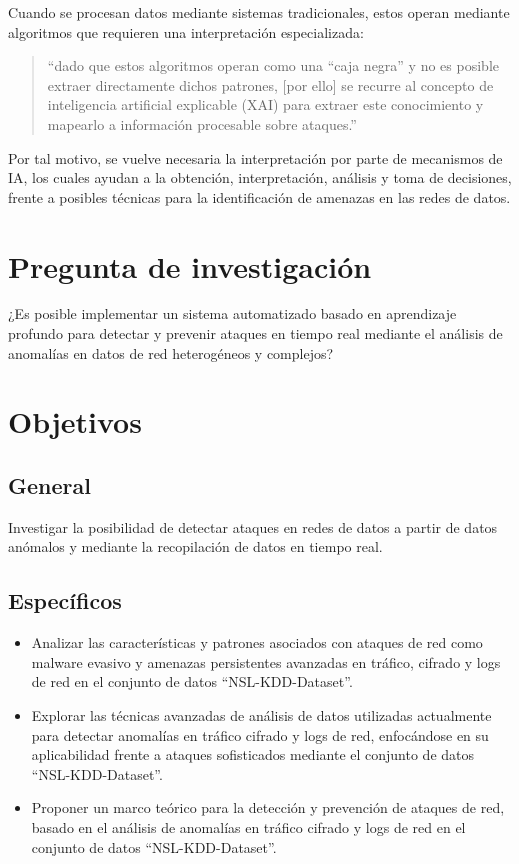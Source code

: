 \documentclass[12pt,a4paper]{article}
\begin{document}
Cuando se procesan datos mediante sistemas tradicionales, estos operan mediante algoritmos que requieren una interpretación especializada:

\begin{quote}
``dado que estos algoritmos operan como una ``caja negra'' y no es posible extraer directamente dichos patrones, [por ello] se recurre al concepto de inteligencia artificial explicable (XAI) para extraer este conocimiento y mapearlo a información procesable sobre ataques.'' \cite[pág.~2]{alhawawreh2024explainable}
\end{quote}

Por tal motivo, se vuelve necesaria la interpretación por parte de mecanismos de IA, los cuales ayudan a la obtención, interpretación, análisis y toma de decisiones, frente a posibles técnicas para la identificación de amenazas en las redes de datos.

\section{Pregunta de investigación}

¿Es posible implementar un sistema automatizado basado en aprendizaje profundo para detectar y prevenir ataques en tiempo real mediante el análisis de anomalías en datos de red heterogéneos y complejos?

\section{Objetivos}

\subsection{General}
Investigar la posibilidad de detectar ataques en redes de datos a partir de datos anómalos y mediante la recopilación de datos en tiempo real.

\subsection{Específicos}
\begin{itemize}
    \item Analizar las características y patrones asociados con ataques de red como malware evasivo y amenazas persistentes avanzadas en tráfico, cifrado y logs de red en el conjunto de datos ``NSL-KDD-Dataset''.
    \item Explorar las técnicas avanzadas de análisis de datos utilizadas actualmente para detectar anomalías en tráfico cifrado y logs de red, enfocándose en su aplicabilidad frente a ataques sofisticados mediante el conjunto de datos ``NSL-KDD-Dataset''.
    \item Proponer un marco teórico para la detección y prevención de ataques de red, basado en el análisis de anomalías en tráfico cifrado y logs de red en el conjunto de datos ``NSL-KDD-Dataset''.
\end{itemize}
\end{document}
